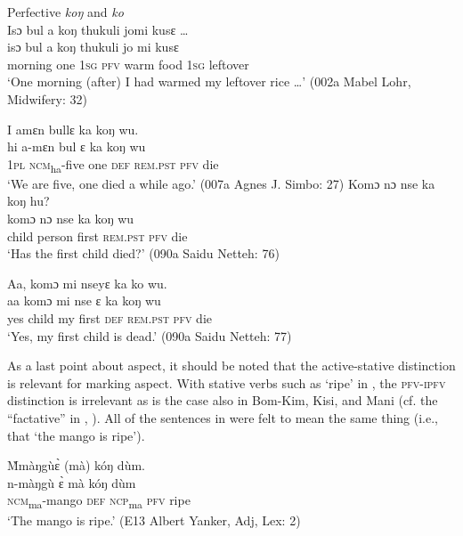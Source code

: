 \ea%
    \label{ex:116}
    Perfective \textit{koŋ} and \textit{ko}\\
\ea \label{ex:116a} Isɔ bul a koŋ thukuli jomi kusɛ …\\
\gll isɔ        bul  a    koŋ    thukuli  jo    mi    kusɛ\\
morning    one  \textsc{1sg}  \textsc{pfv}    warm    food  \textsc{1sg}  leftover\\
\glt ‘One morning (after) I had warmed my leftover rice …' (002a Mabel Lohr, Midwifery: 32)

\ex  \label{ex:116b} I amɛn bullɛ ka koŋ wu.\\
\gll hi    a-mɛn    bul  ɛ    ka        koŋ  wu\\
\textsc{1pl}  \textsc{ncm}\textsubscript{ha}{}-five  one  \textsc{def}  \textsc{rem.pst}    \textsc{pfv}  die\\
\glt ‘We are five, one died a while ago.' (007a Agnes J. Simbo: 27)
\ex\label{ex:116c}  Komɔ nɔ nse ka koŋ hu?\\
\gll komɔ    nɔ      nse  ka        koŋ    wu\\
child    person  first  \textsc{rem.pst}    \textsc{pfv}    die\\
\glt ‘Has the first child died?' (090a Saidu Netteh: 76)

\ex  \label{ex:116d} Aa, komɔ mi nseyɛ ka ko wu.\\
\gll aa    komɔ    mi    nse  ɛ    ka       koŋ    wu\\
yes  child    my  first  \textsc{def}  \textsc{rem.pst}  \textsc{pfv}     die\\
\glt ‘Yes, my first child is dead.' (090a Saidu Netteh: 77)
\z
\z

As a last point about aspect, it should be noted that the active-stative distinction is relevant for marking aspect. With stative verbs such as ‘ripe' in , the \textsc{pfv}{}-\textsc{ipfv} distinction is irrelevant as is the case also in Bom-Kim, Kisi, and Mani (cf. the “factative” in \citealt[14]{NurseEtAl2013}, \citealt{Welmers1973}). All of the sentences in  were felt to mean the same thing (i.e., that ‘the mango is ripe').

\ea%
    \label{ex:117}
    \ea \label{ex:117a} M̀màŋgùɛ̀ (mà) kóŋ dùm.\\
    \gll n-màŋgù      ɛ̀    mà    kóŋ  dùm\\
    \textsc{ncm}\textsubscript{ma}{}-mango  \textsc{def}  \textsc{ncp}\textsubscript{ma}    \textsc{pfv}  ripe\\
    \glt ‘The mango is ripe.' (E13 Albert Yanker, Adj, Lex: 2)


